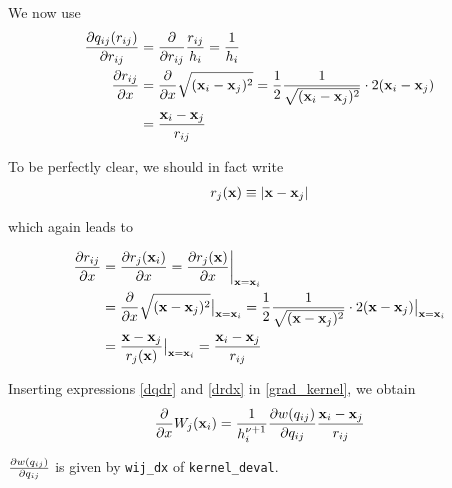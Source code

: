 We now use
\begin{align}
	\frac{\partial q_{ij}(r_{ij})}{\partial r_{ij}} 	&= \frac{\partial}{\partial r_{ij}} \frac{r_{ij}}{h_i} = \frac{1}{h_i}		\label{dqdr} \\
	\frac{\partial r_{ij}}{\partial x}		&= \frac{\partial}{\partial x} \sqrt{(\mathbf{x}_i - \mathbf{x}_j)^2}
							= \frac{1}{2} \frac{1}{\sqrt{(\mathbf{x}_i - \mathbf{x}_j)^2}} \cdot 2 (\mathbf{x}_i - \mathbf{x}_j) \nonumber \\
						&= \frac{\mathbf{x}_i - \mathbf{x}_j}{r_{ij}} 	\label{drdx}
\end{align}











To be perfectly clear, we should in fact write
\begin{align*}
	r_j(\mathbf{x}) & \equiv | \mathbf{x} - \mathbf{x}_j | \\
\end{align*}

which again leads to

\begin{align*}
	\frac{\partial r_{ij}}{\partial x}		&= \frac{\partial r_j(\mathbf{x}_i)}{\partial x} = \frac{\partial r_j(\mathbf{x})}{\partial x} \bigg{|}_{\mathbf{x} = \mathbf{x}_i} \\
						&= \frac{\partial}{\partial x} \sqrt{(\mathbf{x} - \mathbf{x}_j)^2} \big{|}_{\mathbf{x} = \mathbf{x}_i}
							= \frac{1}{2} \frac{1}{\sqrt{(\mathbf{x} - \mathbf{x}_j)^2}} \cdot 2 (\mathbf{x} - \mathbf{x}_j)  \big{|}_{\mathbf{x} = \mathbf{x}_i} \\
						&= \frac{\mathbf{x} - \mathbf{x}_j}{r_{j}(\mathbf{x})} \big{|}_{\mathbf{x} = \mathbf{x}_i} 
							= \frac{\mathbf{x}_i - \mathbf{x}_j}{r_{ij}}
\end{align*}



















Inserting expressions \ref{dqdr} and \ref{drdx} in \ref{grad_kernel}, we obtain
\begin{equation}
	\frac{\partial}{\partial x} W_j (\mathbf{x}_i)  = \frac{1}{h_i^{\nu + 1}} \frac{\partial w(q_{ij})}{\partial q_{ij}}  \frac{\mathbf{x}_i - \mathbf{x}_j}{r_{ij}} 	\label{grad_kernel_final}
\end{equation}



$\frac{\partial w(q_{ij})}{\partial q_{ij}}$ is given by \verb|wij_dx| of \verb|kernel_deval|.








